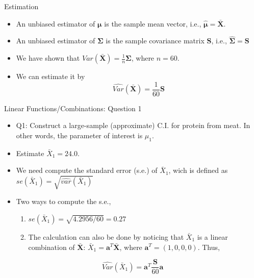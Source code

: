\documentclass[
  ignorenonframetext,
]{beamer}
\providecommand{\tightlist}{%
  \setlength{\itemsep}{0pt}\setlength{\parskip}{0pt}}
\begin{document}
\begin{frame}{Estimation}
\protect\hypertarget{estimation}{}
\begin{itemize}
\tightlist
\item
  An unbiased estimator of \(\boldsymbol\mu\) is the sample mean vector,
  i.e., \(\hat{\boldsymbol \mu}=\bar{\mathbf X}\).
\item
  An unbiased estimator of \(\boldsymbol \Sigma\) is the sample
  covariance matrix \(\mathbf S\), i.e.,
  \(\hat{\boldsymbol \Sigma}=\mathbf S\)
\item
  We have shown that
  \(Var(\bar{\mathbf X})=\frac{1}{n}\boldsymbol \Sigma\), where
  \(n=60\).
\item
  We can estimate it by
  \[\hat{Var}(\bar{\mathbf X})=\frac{1}{60}\mathbf S\]
\end{itemize}
\end{frame}

\begin{frame}{Linear Functions/Combinations: Question 1}
\protect\hypertarget{linear-functionscombinations-question-1}{}
\begin{itemize}
\tightlist
\item
  Q1: Construct a large-sample (approximate) C.I. for protein from meat.
  In other words, the parameter of interest is \(\mu_1\).
\item
  Estimate \(\bar X_1=24.0\).
\item
  We need compute the standard error (s.e.) of \(\bar X_1\), wich is
  defined as \(se(\bar X_1)=\sqrt{\hat{var}(\bar X_1)}\)
\item
  Two ways to compute the s.e.,

  \begin{enumerate}
  \tightlist
  \item
    \(se(\bar X_1)=\sqrt{4.2956/60}=0.27\)
  \item
    The calculation can also be done by noticing that \(\bar X_1\) is a
    linear combination of \(\bar{\mathbf X}\):
    \(\bar X_1 =\mathbf a^T \bar{\mathbf X}\), where
    \(\mathbf a^T=(1, 0, 0, 0)\). Thus,
  \end{enumerate}
\end{itemize}

\[\hat{Var}(\bar X_1)=\mathbf a^T \frac{\mathbf S}{60} \mathbf a\]
\end{frame}
\end{document}
